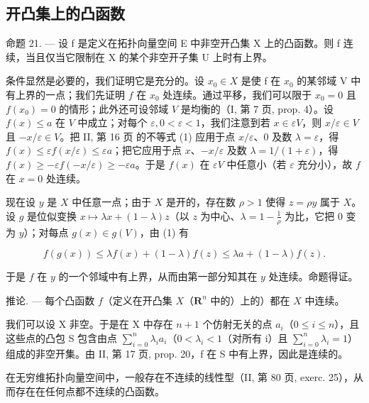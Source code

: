 \subsection{开凸集上的凸函数}

命题 21. --- 设 f 是定义在拓扑向量空间 E 中非空开凸集 X 上的凸函数。则 f 连续，当且仅当它限制在 X 的某个非空开子集 U 上时有上界。

条件显然是必要的，我们证明它是充分的。设 \(x_{0} \in X\) 是使 f 在 \(x_{0}\) 的某邻域 V 中有上界的一点；我们先证明 \(f\) 在 \(x_0\) 处连续。通过平移，我们可以限于 \(x_0 = 0\) 且 \(f(x_0) = 0\) 的情形；此外还可设邻域 \(V\) 是均衡的（I, 第 7 页, prop. 4）。设 \(f(x) \leqslant a\) 在 \(V\) 中成立；对每个 \(\varepsilon, 0 < \varepsilon < 1\)，我们注意到若 \(x \in \varepsilon V\)，则 \(x / \varepsilon \in V\) 且 \(-x / \varepsilon \in V\)。把 II, 第 16 页 的不等式 (1) 应用于点 \(x / \varepsilon\)、0 及数 \(\lambda = \varepsilon\)，得 \(f(x) \leqslant \varepsilon f(x / \varepsilon) \leqslant \varepsilon a\)；把它应用于点 \(x\)、\(-x / \varepsilon\) 及数 \(\lambda = 1 / (1 + \varepsilon)\)，得 \(f(x) \geqslant -\varepsilon f(-x / \varepsilon) \geqslant -\varepsilon a\)。于是 \(f(x)\) 在 \(\varepsilon V\) 中任意小（若 \(\varepsilon\) 充分小），故 \(f\) 在 \(x = 0\) 处连续。

现在设 \(y\) 是 \(X\) 中任意一点；由于 \(X\) 是开的，存在数 \(\rho > 1\) 使得 \(z = \rho y\) 属于 \(X\)。设 \(g\) 是位似变换 \(x \mapsto \lambda x + (1 - \lambda)z\)（以 \(z\) 为中心、\(\lambda = 1 - \frac{1}{\rho}\) 为比，它把 0 变为 \(y\)）；对每点 \(g(x) \in g(V)\)，由 (1) 有

\[
f (g (x)) \leqslant \lambda f (x) + (1 - \lambda) f (z) \leqslant \lambda a + (1 - \lambda) f (z).
\]

于是 \(f\) 在 \(y\) 的一个邻域中有上界，从而由第一部分知其在 \(y\) 处连续。命题得证。

推论. --- 每个凸函数 \(f\)（定义在开凸集 \(X\)（\(\mathbf{R}^n\) 中的）上的）都在 \(X\) 中连续。

我们可以设 X 非空。于是在 X 中存在 \(n + 1\) 个仿射无关的点 \(a_{i}\)（\(0 \leqslant i \leqslant n\)），且这些点的凸包 S 包含由点 \(\sum_{i=0}^{n} \lambda_{i} a_{i}\)（\(0 < \lambda_{i} < 1\)（对所有 i）且 \(\sum_{i=0}^{n} \lambda_{i} = 1\)）组成的非空开集。由 II, 第 17 页, prop. 20，f 在 S 中有上界，因此是连续的。

在无穷维拓扑向量空间中，一般存在不连续的线性型（II, 第 80 页, exerc. 25），从而存在在任何点都不连续的凸函数。

